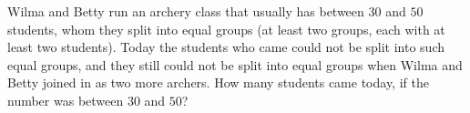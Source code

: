 Wilma and Betty run an archery class that usually has between $30$ and $50$ students, whom they split into equal groups (at least two groups, each with at least two students). Today the students who came could not be split into such equal groups, and they still could not be split into equal groups when Wilma and Betty joined in as two more archers. How many students came today, if the number was between $30$ and $50$?
